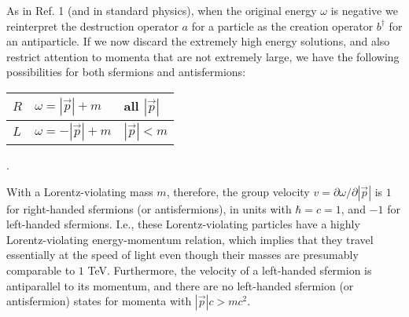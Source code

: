 \documentclass{ws-procs9x6}
\begin{document}
As in Ref. 1 (and in standard physics), when the original energy $\omega $
is negative we reinterpret the destruction operator $a$ for a particle as
the creation operator $b^{\dagger }$ for an antiparticle. If we now discard
the extremely high energy solutions, and also restrict attention to momenta
that are not extremely large, we have the following possibilities for both
sfermions and antisfermions:
\begin{center}
\begin{tabular}{|l|l|l|}
\hline
$R$ & $\omega =\left| \vec{p}\right| +m$ & all $\left| \vec{p}\right| $ \\
\hline
$L$ & $\omega =-\left| \vec{p}\right| +m$ & $\left| \vec{p}\right| <m$ \\
\hline
\end{tabular} .
\end{center}
\noindent With a Lorentz-violating mass $m$, therefore, the group velocity
$v=\partial \omega /\partial \left| \vec{p}\right| $ is $1$ for right-handed
sfermions (or antisfermions), in units with $\hbar =c=1$, and $-1$ for
left-handed sfermions. I.e., these Lorentz-violating particles have a highly
Lorentz-violating energy-momentum relation, which implies that they travel
essentially at the speed of light even though their masses are presumably
comparable to $1$ TeV. Furthermore, the velocity of a left-handed sfermion
is antiparallel to its momentum, and there are no left-handed sfermion (or
antisfermion) states for momenta with $\left| \vec{p}\right| c>mc^{2}$.
\end{document}
